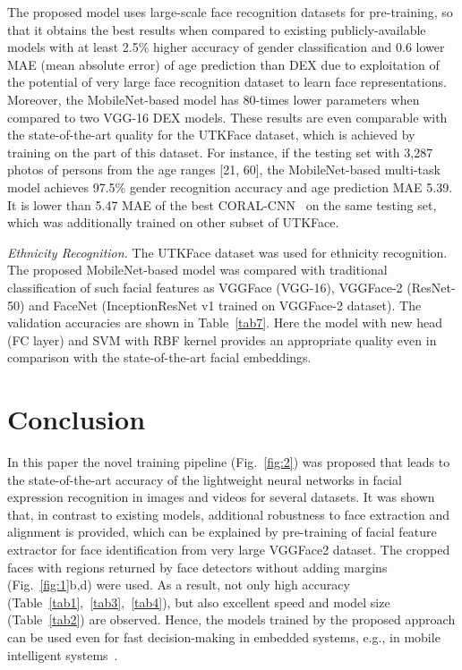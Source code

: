 \documentclass[runningheads]{llncs}
\begin{document}
The proposed model uses large-scale face recognition datasets for pre-training, so that it obtains the best results when compared to existing publicly-available models with at least 2.5\% higher accuracy of gender classification and 0.6 lower MAE (mean absolute error) of age prediction than DEX due to exploitation of the potential of very large face recognition dataset to learn face representations. Moreover, the MobileNet-based model has 80-times lower parameters when compared to two VGG-16 DEX models. These results are even comparable with the state-of-the-art quality for the UTKFace dataset, which is achieved by training on the part of this dataset. For instance, if the testing set with 3,287 photos of persons from the age ranges [21, 60], the MobileNet-based multi-task model achieves 97.5\% gender recognition accuracy and age prediction MAE 5.39. It is lower than 5.47 MAE of the best CORAL-CNN~\cite{cao2019consistent} on the same testing set, which was additionally trained on other subset of UTKFace. 

\textit{Ethnicity Recognition.} The UTKFace dataset was used for ethnicity recognition. The proposed MobileNet-based model was compared with traditional classification of such facial features as VGGFace (VGG-16), VGGFace-2 (ResNet-50) and FaceNet (InceptionResNet v1 trained on VGGFace-2 dataset). The validation accuracies are shown in Table~\ref{tab7}. Here the model with new head (FC layer) and SVM with RBF kernel provides an appropriate quality even in comparison with the state-of-the-art facial embeddings. 

\section{Conclusion}\label{sec:5}
In this paper the novel training pipeline (Fig.~\ref{fig:2}) was proposed that leads to the state-of-the-art accuracy of the lightweight neural networks in facial expression recognition in images and videos for several datasets. It was shown that, in contrast to existing models, additional robustness to face extraction and alignment is provided, which can be explained by pre-training of facial feature extractor for face identification from very large VGGFace2 dataset. The cropped faces with regions returned by face detectors without adding margins (Fig.~\ref{fig:1}b,d) were used. As a result, not only high accuracy (Table~\ref{tab1},~\ref{tab3},~\ref{tab4}), but also excellent speed and model size (Table~\ref{tab2}) are observed. Hence, the models trained by the proposed approach can be used even for fast decision-making in embedded systems, e.g., in mobile intelligent systems~\cite{demochkina2021mobileemotiface}. 
\end{document}
